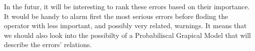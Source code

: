 \documentclass[../main.tex]{subfiles}
\begin{document}
    In the futur, it will be interesting to rank these errors based on their importance. It would be handy to alarm first the most serious errors before floding the operator with less important, and possibly very related, warnings. It means that we should also look into the possibilty of a Probabiliscal Grapical Model that will describe the errors' relations.
\end{document}
